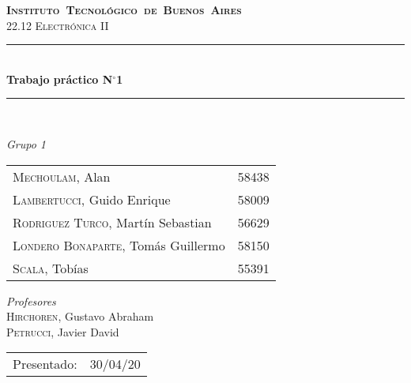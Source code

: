 \begin{titlepage}
\newcommand{\HRule}{\rule{\linewidth}{0.5mm}}
\center
\mbox{\textsc{\LARGE \bfseries {Instituto Tecnológico de Buenos Aires}}}\\[1.5cm]
\textsc{\Large 22.12 Electrónica II}\\[0.5cm]


\HRule \\[0.6cm]
{ \Huge \bfseries Trabajo práctico N$^{\circ}$1}\\[0.4cm] 
\HRule \\[1.5cm]


{\large

\emph{Grupo 1}\\
\vspace{3px}

\begin{tabular}{lr} 	
\textsc{Mechoulam}, Alan  &  58438\\
\textsc{Lambertucci}, Guido Enrique  & 58009 \\
\textsc{Rodriguez Turco}, Martín Sebastian  & 56629 \\
\textsc{Londero Bonaparte}, Tomás Guillermo  & 58150 \\
\textsc{Scala}, Tobías & 55391 \\
\end{tabular}

\vspace{20px}

\emph{Profesores}\\
\textsc{Hirchoren}, Gustavo Abraham\\
\textsc{Petrucci}, Javier David\\
\vspace{3px}

\vspace{100px}

\begin{tabular}{ll}

Presentado: & 30/04/20\\

\end{tabular}

}

\vfill

\end{titlepage}
